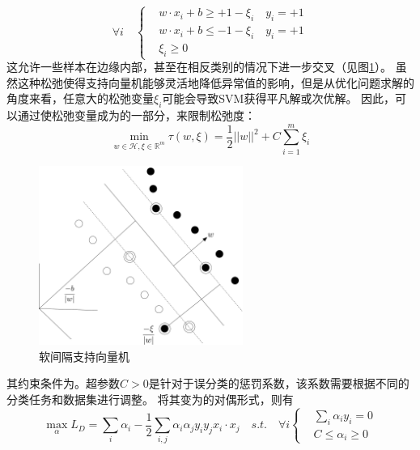 \begin{equation}
	\forall i \quad
	\left\{
	 \begin{aligned}
	&w\cdot x_i + b \geq +1-\xi_i \quad y_i=+1  \\
	&w\cdot x_i + b \leq -1-\xi_i \quad y_i=+1  \\
	&\xi_i \geq 0
	\end{aligned}
	 \right.
	\label{equ:constraint_soft}
\end{equation}
这允许一些样本在边缘内部，甚至在相反类别的情况下进一步交叉（见图\ref{fig:softmargin}）。 虽然这种松弛使得支持向量机能够灵活地降低异常值的影响，但是从优化问题求解的角度来看，任意大的松弛变量$\xi_i$可能会导致SVM获得平凡解或次优解。 因此，可以通过使松弛变量成为的一部分，来限制松弛度：
\begin{equation}
	\min \limits_{w\in \mathcal{H},\xi\in \mathbb{R}^m} \tau(w,\xi)=\frac{1}{2}||w||^2+C\sum_{i=1}^m {\xi_i}
\end{equation}
\begin{figure}[hbt]
	\centering
	\includegraphics[width=6.67cm]{figures/emitter/svm_soft}
	\caption{软间隔支持向量机}
	\label{fig:softmargin}
\end{figure}
其约束条件为。超参数$C>0$是针对于误分类的惩罚系数，该系数需要根据不同的分类任务和数据集进行调整。
将其变为的对偶形式，则有
\begin{equation}
	\max \limits_{\alpha} L_D=\sum_i{\alpha_i}-\frac{1}{2}\sum_{i,j}\alpha_i\alpha_jy_iy_jx_i\cdot x_j \quad s.t. \quad \forall i
	\left\{
		\begin{aligned}
	   &\sum_i{\alpha_iy_i}=0  \\
	   &C \leq \alpha_i \geq 0
	   \end{aligned}
		\right.
	\label{equ:cdotdual}
\end{equation}

